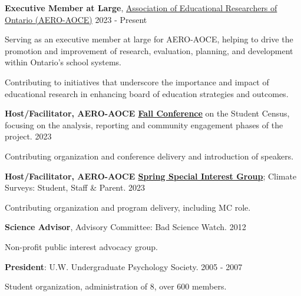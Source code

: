 \documentclass[10pt]{article}
\newenvironment{innerlist}[1][\enskip\textbullet]%
        {\begin{compactenum}[#1]}{\end{compactenum}}
\providecommand{\tightlist}{%
  \setlength{\itemsep}{0pt}\setlength{\parskip}{0pt}}
\begin{document}
\begin{outerlist}
\item
  \textbf{Executive Member at Large},
  \href{https://www.aero-aoce.org/aero-aoce-executiveexeacutecutif-drsquoaero-aoce.html}{Association
  of Educational Researchers of Ontario (AERO-AOCE)} \hfill 2023 -
  Present

 \begin{innerlist}
  \tightlist
  \item
    Serving as an executive member at large for AERO-AOCE, helping to
    drive the promotion and improvement of research, evaluation,
    planning, and development within Ontario's school systems.
  \item
    Contributing to initiatives that underscore the importance and
    impact of educational research in enhancing board of education
    strategies and outcomes.
 \end{innerlist}
\item
  \textbf{Host/Facilitator, AERO-AOCE
  \href{https://mail.google.com/mail/u/0/\#search/aero+fall+conference?projector=1}{Fall
  Conference}} on the Student Census, focusing on the analysis,
  reporting and community engagement phases of the project. \hfill 2023

 \begin{innerlist}
  \tightlist
  \item
    Contributing organization and conference delivery and introduction
    of speakers.
 \end{innerlist}
\item
  \textbf{Host/Facilitator, AERO-AOCE
  \href{https://drive.google.com/file/d/1mNDOn_Xfc6B3_2UVLKF-4KWSdrHhBFQp/view}{Spring
  Special Interest Group}}; Climate Surveys: Student, Staff \& Parent.
  \hfill 2023

 \begin{innerlist}
  \tightlist
  \item
    Contributing organization and program delivery, including MC role.
 \end{innerlist}
\item
  \textbf{Science Advisor}, Advisory Committee: Bad Science Watch.
  \hfill 2012

 \begin{innerlist}
  \tightlist
  \item
    Non-profit public interest advocacy group.
 \end{innerlist}
\item
  \textbf{President}: U.W. Undergraduate Psychology Society. \hfill 2005
  - 2007

 \begin{innerlist}
  \tightlist
  \item
    Student organization, administration of 8, over 600 members.
 \end{innerlist}
\end{outerlist}
\end{document}
